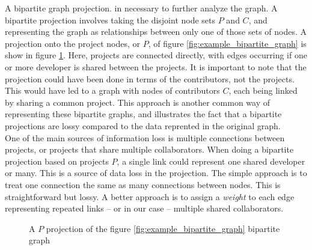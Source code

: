 \documentclass{proc}
\begin{document}
A bipartite graph projection. in necessary to further analyze the graph. A bipartite projection involves taking the disjoint node sets $P$ and $C$, and representing the graph as relationships between only one of those sets of nodes. A projection onto the project nodes, or $P$, of figure \ref{fig:example_bipartite_graph} is show in figure \ref{fig:example_bipartite_projection_graph}. Here, projects are connected directly, with edges occurring if one or more developer is shared between the projects. It is important to note that the projection could have been done in terms of the contributors, not the projects. This would have led to a graph with nodes of contributors $C$, each being linked by sharing a common project. This approach is another common way of representing these bipartite graphs\cite{newman2001scientific}, and illustrates the fact that a bipartite projections are lossy compared to the data reprented in the original graph\cite{zhou2007bipartite}.\\

One of the main sources of information loss is multiple connections between projects, or projects that share multiple collaborators. When doing a bipartite projection based on projects $P$, a single link could represent one shared developer or many. This is a source of data loss in the projection. The simple approach is to treat one connection the same as many connections between nodes. This is straightforward but lossy\cite{zhou2007bipartite,grossman1995portion}. A better approach is to assign a \textit{weight} to each edge representing repeated links -- or in our case -- multiple shared collaborators\cite{zha2001bipartite,barrat2004architecture}.

\begin{figure}
\centering
{}
\caption{A $P$ projection of the figure \ref{fig:example_bipartite_graph} bipartite graph}
\label{fig:example_bipartite_projection_graph}
\end{figure}
\end{document}

